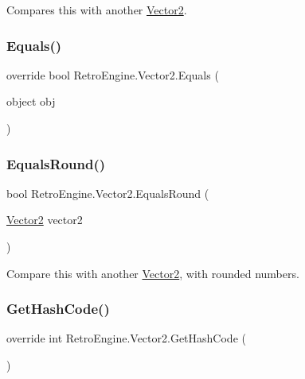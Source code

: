 Compares this with another \mbox{\hyperlink{struct_retro_engine_1_1_vector2}{Vector2}}. 

\mbox{\label{struct_retro_engine_1_1_vector2_a03e6b432df3fa91d95a1701a739ad64d}} 
\subsubsection{\texorpdfstring{Equals()}{Equals()}\hspace{0.1cm}{\footnotesize\ttfamily [2/2]}}
{\footnotesize\ttfamily override bool Retro\+Engine.\+Vector2.\+Equals (\begin{DoxyParamCaption}\item[{object}]{obj }\end{DoxyParamCaption})}

\mbox{\label{struct_retro_engine_1_1_vector2_ac46e2c154d9f5591f3a048ff127869f9}} 
\subsubsection{\texorpdfstring{EqualsRound()}{EqualsRound()}}
{\footnotesize\ttfamily bool Retro\+Engine.\+Vector2.\+Equals\+Round (\begin{DoxyParamCaption}\item[{\mbox{\hyperlink{struct_retro_engine_1_1_vector2}{Vector2}}}]{vector2 }\end{DoxyParamCaption})}



Compare this with another \mbox{\hyperlink{struct_retro_engine_1_1_vector2}{Vector2}}, with rounded numbers. 

\mbox{\label{struct_retro_engine_1_1_vector2_a2611bd1571a8a191443fd6e43373ad73}} 
\subsubsection{\texorpdfstring{GetHashCode()}{GetHashCode()}}
{\footnotesize\ttfamily override int Retro\+Engine.\+Vector2.\+Get\+Hash\+Code (\begin{DoxyParamCaption}{ }\end{DoxyParamCaption})}


